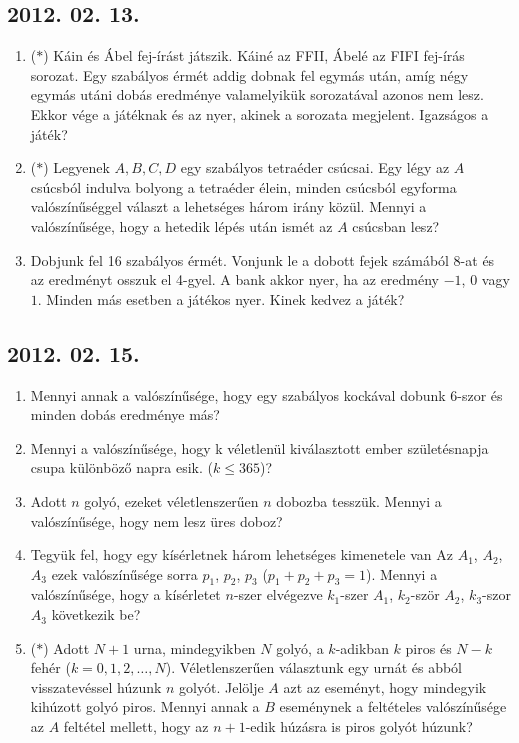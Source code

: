 \subsection*{2012. 02. 13.}
\begin{enumerate}
\item ($*$)
Káin és Ábel fej-írást játszik. Káiné az FFII, Ábelé az FIFI fej-írás sorozat. Egy szabályos érmét addig dobnak fel egymás után, amíg négy egymás utáni dobás eredménye valamelyikük sorozatával azonos nem lesz. Ekkor vége a játéknak és az nyer, akinek a sorozata megjelent. Igazságos a játék?
\item ($*$)
Legyenek $A, B, C, D$ egy szabályos tetraéder csúcsai. Egy légy az $A$ csúcsból indulva bolyong a tetraéder élein, minden csúcsból egyforma valószínűséggel választ a lehetséges három irány közül. Mennyi a valószínűsége, hogy a hetedik lépés után ismét az $A$ csúcsban lesz?
\item
Dobjunk fel 16 szabályos érmét. Vonjunk le a dobott fejek számából 8-at és az eredményt osszuk el 4-gyel. A bank akkor nyer, ha az eredmény $-1$, $0$ vagy $1$. Minden más esetben a játékos nyer. Kinek kedvez a játék?
\end{enumerate}

\subsection*{2012. 02. 15.}
\begin{enumerate}
\item
Mennyi annak a valószínűsége, hogy egy szabályos kockával dobunk 6-szor és minden dobás eredménye más?
\item
Mennyi a valószínűsége, hogy k véletlenül kiválasztott ember születésnapja csupa különböző napra esik. ($k\le 365$)?
\item
Adott $n$ golyó, ezeket véletlenszerűen $n$ dobozba tesszük. Mennyi a valószínűsége, hogy nem lesz üres doboz?
\item Tegyük fel, hogy egy kísérletnek három lehetséges kimenetele van Az $A_{1}$, $A_{2}$, $A_{3}$ ezek valószínűsége sorra $p_{1}$, $p_{2}$, $p_{3}$ ($p_{1}+p_{2}+p_{3}=1$). Mennyi a valószínűsége, hogy a kísérletet $n$-szer elvégezve $k_{1}$-szer $A_{1}$, $k_{2}$-ször $A_{2}$, $k_{3}$-szor $A_{3}$ következik be?
\item ($*$)
Adott $N+1$ urna, mindegyikben $N$ golyó, a $k$-adikban $k$ piros és $N-k$ fehér ($k=0, 1, 2, \ldots, N$). Véletlenszerűen választunk egy urnát és abból visszatevéssel húzunk $n$ golyót. Jelölje $A$ azt az eseményt, hogy mindegyik kihúzott golyó piros. Mennyi annak a $B$ eseménynek a feltételes valószínűsége az $A$ feltétel mellett, hogy az $n+1$-edik húzásra is piros golyót húzunk?
\end{enumerate}

